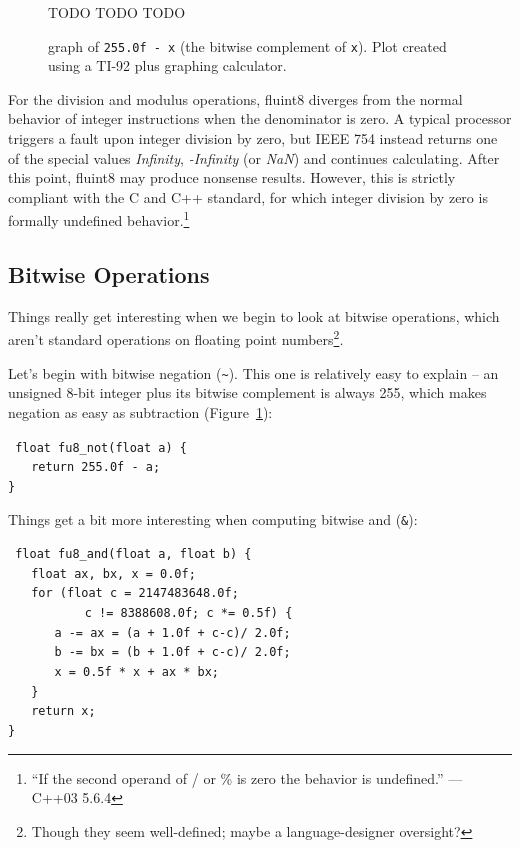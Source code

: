 \documentclass{acmsiggraph}
\theoremstyle{remark}
\theoremstyle{definition}
\begin{document}
\begin{figure}[tb!]
\begin{center}
\huge TODO TODO TODO
\end{center}
\caption{\label{fig-not-graph} graph of {\tt 255.0f - x} (the bitwise complement of {\tt x}).
{\small Plot created using a TI-92 plus graphing calculator.}}
\end{figure}


For the division and modulus operations, fluint8 diverges from the
normal behavior of integer instructions when the denominator is zero.
A typical processor triggers a fault upon integer division by zero,
but IEEE 754 instead returns one of the special values {\it Infinity},
{\it -Infinity} (or {\it NaN}) and continues calculating. After this
point, fluint8 may produce nonsense results. However, this is strictly
compliant with the C and C++ standard, for which integer division by
zero is formally undefined behavior.\footnote{``If the second operand of / or \% is zero the behavior is undefined.'' --- C++03 5.6.4}

\subsection{Bitwise Operations}

Things really get interesting when we begin to look at bitwise operations, which aren't standard operations on floating point numbers\footnote{Though they seem well-defined; maybe a language-designer oversight?}.

Let's begin with bitwise negation ({\tt \textasciitilde}).
This one is relatively easy to explain -- an unsigned 8-bit integer plus its bitwise complement is always 255, which makes negation as easy as subtraction (Figure~\ref{fig-not-graph}):

{\tt
float fu8\_not(float a) \{ \\
$\phantom{XX}$return 255.0f - a; \\
\}
}

Things get a bit more interesting when computing bitwise and ({\tt \&}):

{\tt
float fu8\_and(float a, float b) \{ \\
$\phantom{XX}$float ax, bx, x = 0.0f; \\
$\phantom{XX}$for (float c = 2147483648.0f;\\
$\phantom{XXXXXX}$ c != 8388608.0f; c *= 0.5f) \{ \\
$\phantom{XXXX}$a -= ax = (a + 1.0f + c-c)/ 2.0f; \\
$\phantom{XXXX}$b -= bx = (b + 1.0f + c-c)/ 2.0f; \\
$\phantom{XXXX}$x = 0.5f * x + ax * bx; \\
$\phantom{XX}$\} \\
$\phantom{XX}$return x; \\
\}
}
\end{document}
